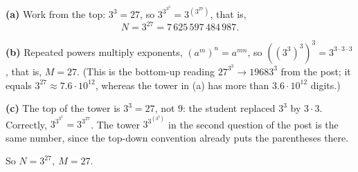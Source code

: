 \textbf{(a)} Work from the top: $3^3=27$, so $3^{3^{3^3}}=3^{\left(3^{27}\right)}$, that is,
\[
N=3^{27}=7\,625\,597\,484\,987 .
\]

\textbf{(b)} Repeated powers multiply exponents, $\left(a^m\right)^n=a^{mn}$, so $\left(\left(3^3\right)^3\right)^3=3^{3\cdot3\cdot3}$, that is, $M=27$. (This is the bottom-up reading $27^{3^3}\to19683^3$ from the post; it equals $3^{27}\approx7.6\cdot10^{12}$, whereas the tower in (a) has more than $3.6\cdot10^{12}$ digits.)

\textbf{(c)} The top of the tower is $3^3=27$, not $9$: the student replaced $3^3$ by $3\cdot3$. Correctly, $3^{3^{3^3}}=3^{3^{27}}$. The tower $3^{3^{\left(3^3\right)}}$ in the second question of the post is the same number, since the top-down convention already puts the parentheses there.

So $\boxed{N=3^{27},\ M=27}$.

